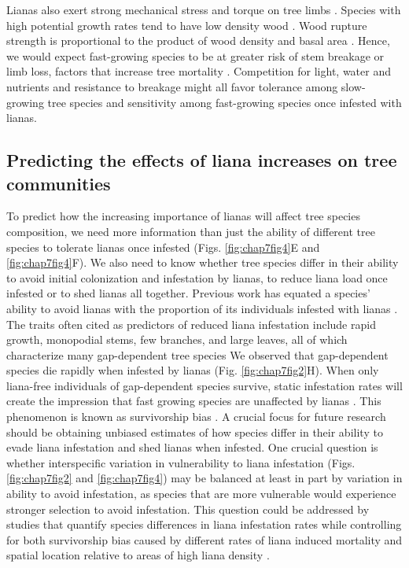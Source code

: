 \documentclass[b5paper,justified]{tufte-book} %
\begin{document}
\begin{fullwidth}
Lianas also exert strong mechanical stress and torque on tree limbs \citep{Putz1984a}. Species with high potential growth rates tend to have low density wood \citep{Wright2010}. Wood rupture strength is proportional to the product of wood density and basal area \citep{Larjavaara2010}. Hence, we would expect fast-growing species to be at greater risk of stem breakage or limb loss, factors that increase tree mortality \citep{Paciorek2000}. Competition for light, water and nutrients and resistance to breakage might all favor tolerance among slow-growing tree species and sensitivity among fast-growing species once infested with lianas.  

\subsection{Predicting the effects of liana increases on tree communities }
To predict how the increasing importance of lianas will affect tree species composition, we need more information than just the ability of different tree species to tolerate lianas once infested (Figs. \ref{fig:chap7fig4}E and \ref{fig:chap7fig4}F). We also need to know whether tree species differ in their ability to avoid initial colonization and infestation by lianas, to reduce liana load once infested or to shed lianas all together. Previous work has equated a species' ability to avoid lianas with the proportion of its individuals infested with lianas \citep{Putz1984a, Clark1990, Heijden2008}. The traits often cited as predictors of reduced liana infestation include rapid growth, monopodial stems, few branches, and large leaves, all of which characterize many gap-dependent tree species \citep{Putz1984,Putz1984a} We observed that gap-dependent species die rapidly when infested by lianas (Fig. \ref{fig:chap7fig2}H). When only liana-free individuals of gap-dependent species survive, static infestation rates will create the impression that fast growing species are unaffected by lianas \citep[e.g.][]{Clark1990}. This phenomenon is known as survivorship bias \citep[e.g.][]{Zens2003}. A crucial focus for future research should be obtaining unbiased estimates of how species differ in their ability to evade liana infestation and shed lianas when infested. One crucial question is whether interspecific variation in vulnerability to liana infestation (Figs. \ref{fig:chap7fig2} and \ref{fig:chap7fig4}) may be balanced at least in part by variation in ability to avoid infestation, as species that are more vulnerable would experience stronger selection to avoid infestation. This question could be addressed by studies that quantify species differences in liana infestation rates while controlling for both survivorship bias caused by different rates of liana induced mortality and spatial location relative to areas of high liana density \citep[e.g. in gaps;][]{Ledo2014}.


\end{fullwidth}
\end{document}
